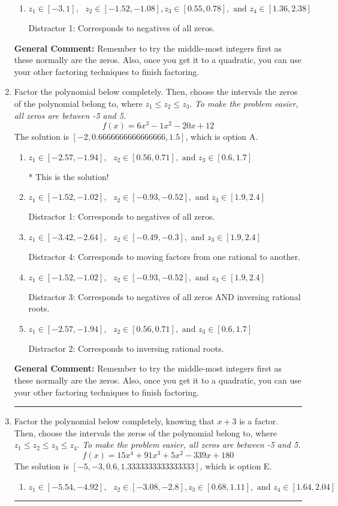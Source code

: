 \documentclass{extbook}[14pt]
\newcommand{\litem}[1]{\item #1

\rule{\textwidth}{0.4pt}}
\begin{document}
\begin{enumerate}
{\begin{enumerate}[label=\Alph*.]
 Distractor 4: Corresponds to moving factors from one rational to another.
\item \( z_1 \in [-3, 1], \text{   }  z_2 \in [-1.52, -1.08], z_3 \in [0.55, 0.78], \text{   and   } z_4 \in [1.36, 2.38] \)

 Distractor 1: Corresponds to negatives of all zeros.
\end{enumerate}

\textbf{General Comment:} Remember to try the middle-most integers first as these normally are the zeros. Also, once you get it to a quadratic, you can use your other factoring techniques to finish factoring.
}
\litem{
Factor the polynomial below completely. Then, choose the intervals the zeros of the polynomial belong to, where $z_1 \leq z_2 \leq z_3$. \textit{To make the problem easier, all zeros are between -5 and 5.}
\[ f(x) = 6x^{3} -1 x^{2} -20 x + 12 \]The solution is \( [-2, 0.6666666666666666, 1.5] \), which is option A.\begin{enumerate}[label=\Alph*.]
\item \( z_1 \in [-2.57, -1.94], \text{   }  z_2 \in [0.56, 0.71], \text{   and   } z_3 \in [0.6, 1.7] \)

* This is the solution!
\item \( z_1 \in [-1.52, -1.02], \text{   }  z_2 \in [-0.93, -0.52], \text{   and   } z_3 \in [1.9, 2.4] \)

 Distractor 1: Corresponds to negatives of all zeros.
\item \( z_1 \in [-3.42, -2.64], \text{   }  z_2 \in [-0.49, -0.3], \text{   and   } z_3 \in [1.9, 2.4] \)

 Distractor 4: Corresponds to moving factors from one rational to another.
\item \( z_1 \in [-1.52, -1.02], \text{   }  z_2 \in [-0.93, -0.52], \text{   and   } z_3 \in [1.9, 2.4] \)

 Distractor 3: Corresponds to negatives of all zeros AND inversing rational roots.
\item \( z_1 \in [-2.57, -1.94], \text{   }  z_2 \in [0.56, 0.71], \text{   and   } z_3 \in [0.6, 1.7] \)

 Distractor 2: Corresponds to inversing rational roots.
\end{enumerate}

\textbf{General Comment:} Remember to try the middle-most integers first as these normally are the zeros. Also, once you get it to a quadratic, you can use your other factoring techniques to finish factoring.
}
\litem{
Factor the polynomial below completely, knowing that $x+3$ is a factor. Then, choose the intervals the zeros of the polynomial belong to, where $z_1 \leq z_2 \leq z_3 \leq z_4$. \textit{To make the problem easier, all zeros are between -5 and 5.}
\[ f(x) = 15x^{4} +91 x^{3} +5 x^{2} -339 x + 180 \]The solution is \( [-5, -3, 0.6, 1.3333333333333333] \), which is option E.\begin{enumerate}[label=\Alph*.]
\item \( z_1 \in [-5.54, -4.92], \text{   }  z_2 \in [-3.08, -2.8], z_3 \in [0.68, 1.11], \text{   and   } z_4 \in [1.64, 2.04] \)


\end{enumerate}}
\end{enumerate}
\end{document}
